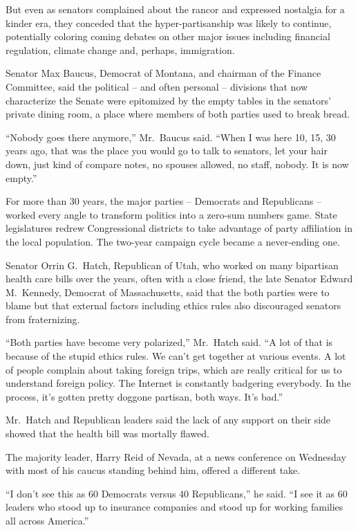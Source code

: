 ﻿\documentclass[12pt]{article}
\begin{document}
But even as senators complained about the rancor and expressed nostalgia for a kinder era, they
conceded that the hyper-partisanship was likely to continue, potentially coloring coming debates on
other major issues including financial regulation, climate change and, perhaps, immigration.

Senator Max Baucus, Democrat of Montana, and chairman of the Finance Committee, said the political
-- and often personal -- divisions that now characterize the Senate were epitomized by the empty
tables in the senators' private dining room, a place where members of both parties used to break
bread.

``Nobody goes there anymore,'' Mr.~Baucus said. ``When I was here 10, 15, 30 years ago, that was the
place you would go to talk to senators, let your hair down, just kind of compare notes, no spouses
allowed, no staff, nobody. It is now empty.''

For more than 30 years, the major parties -- Democrats and Republicans -- worked every angle to
transform politics into a zero-sum numbers game. State legislatures redrew Congressional districts
to take advantage of party affiliation in the local population. The two-year campaign cycle became a
never-ending one.

Senator Orrin G.~Hatch, Republican of Utah, who worked on many bipartisan health care bills over the
years, often with a close friend, the late Senator Edward M.~Kennedy, Democrat of Massachusetts,
said that the both parties were to blame but that external factors including ethics rules also
discouraged senators from fraternizing.

``Both parties have become very polarized,'' Mr.~Hatch said. ``A lot of that is because of the
stupid ethics rules. We can't get together at various events. A lot of people complain about taking
foreign trips, which are really critical for us to understand foreign policy. The Internet is
constantly badgering everybody. In the process, it's gotten pretty doggone partisan, both ways. It's
bad.''

Mr.~Hatch and Republican leaders said the lack of any support on their side showed that the health
bill was mortally flawed.

The majority leader, Harry Reid of Nevada, at a news conference on Wednesday with most of his caucus
standing behind him, offered a different take.

``I don't see this as 60 Democrats versus 40 Republicans,'' he said. ``I see it as 60 leaders who
stood up to insurance companies and stood up for working families all across America.''
\end{document}
